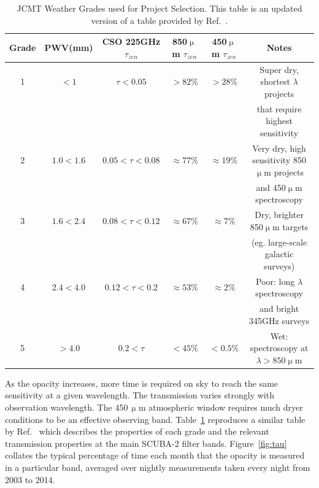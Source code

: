 \documentclass[]{spie}  %
\begin{document}
\begin{table}
\caption{JCMT Weather Grades used for Project Selection. This table is an updated version of a table provided by Ref.\ .}
\label{tab:grades}
\begin{center}
\begin{tabular}{|c|c|c|c|c|c|}
\hline
\rule[-1ex]{0pt}{3.5ex}  Grade & PWV(mm) & CSO 225GHz $\tau_{zen}$ & 850$\upmu$m $\tau_{zen}$ & 450$\upmu$m $\tau_{zen}$ & Notes  \\
\hline
\rule[-1ex]{0pt}{3.5ex}  1 & $< 1$ & $\tau<0.05$ & $> 82\%$ &   $ > 28\%$& Super dry, shortest $\lambda$ projects\\&&&&& that require highest sensitivity\\
\hline
\rule[-1ex]{0pt}{3.5ex}  2 & $1.0 < 1.6$ & $0.05<\tau<0.08$ &  $ \approx77\%$ & $\approx19\%$ &Very dry, high sensitivity 850$\upmu$m projects\\&&&&& and 450$\upmu$m spectroscopy\\
\hline
\rule[-1ex]{0pt}{3.5ex}  3 & $1.6 < 2.4$  & $0.08<\tau<0.12$ &  $\approx67\%$ & $\approx7\%$ & Dry, brighter 850$\upmu$m targets\\ &&&&&(eg. large-scale galactic surveys)\\
\hline
\rule[-1ex]{0pt}{3.5ex}  4 & $2.4 < 4.0$ & $0.12<\tau<0.2$ &  $\approx53\%$ & $\approx2\%$ & Poor: long $\lambda$ spectroscopy \\&&&&&and bright 345GHz surveys\\
\hline
\rule[-1ex]{0pt}{3.5ex}  5 & $ > 4.0 $ & $0.2<\tau$ & $ < 45\%$ & $< 0.5\%$&  Wet: spectroscopy at $\lambda > 850 \upmu$m \\
\hline

\end{tabular}
\end{center}
\end{table}

As the opacity increases, more time is required on sky to reach the
same sensitivity at a given wavelength. The transmission varies
strongly with observation wavelength. The 450\,$\upmu$m atmospheric window
requires much dryer conditions to be an effective observing
band. Table~\ref{tab:grades} reproduces a similar table by
Ref.\  which describes the properties of each grade and the
relevant transmission properties at the main SCUBA-2 filter
bands. Figure~\ref{fig:tau} collates the typical percentage of time
each month that the opacity is measured in a particular band, averaged
over nightly measurements taken every night from 2003 to 2014.
\end{document}
